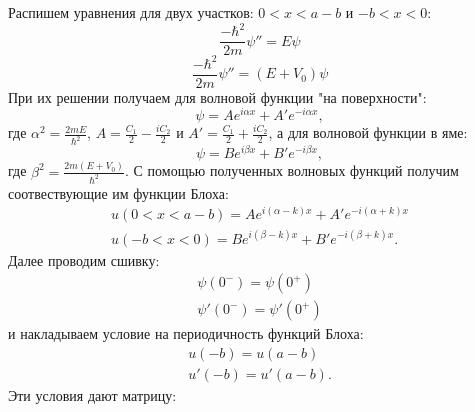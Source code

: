 \documentclass[a4paper, 12pt]{article}
\begin{document}
    Распишем уравнения для двух участков: $0<x<a-b$ и $-b<x<0$:
    \begin{equation}
        \frac{-\hbar^2}{2m}\psi''=E\psi
    \end{equation}
    \begin{equation}
        \frac{-\hbar^2}{2m}\psi''=(E+V_0)\psi
    \end{equation}
    При их решении получаем для волновой функции "на поверхности":
    \begin{equation}
        \psi=Ae^{i\alpha x}+A'e^{-i\alpha x},
    \end{equation}
    где $\alpha^2=\frac{2mE}{\hbar^2}$, $A=\frac{C_1}{2}-\frac{iC_2}{2}$ и $A'=\frac{C_1}{2}+\frac{iC_2}{2}$, а для волновой функции в яме:
    \begin{equation}
        \psi=Be^{i\beta x}+B'e^{-i\beta x},
    \end{equation}
    где $\beta^2=\frac{2m(E+V_0)}{\hbar^2}$. С помощью полученных волновых функций получим соотвествующие им функции Блоха:
    \begin{equation}
        \begin{aligned}
            u(0<x<a-b)=Ae^{i(\alpha-k)x}+A'e^{-i(\alpha+k)x}\\
            u(-b<x<0)=Be^{i(\beta-k)x}+B'e^{-i(\beta+k)x}.
        \end{aligned}
    \end{equation}
    Далее проводим сшивку:
    \begin{equation}
        \begin{aligned}
            \psi(0^-)=\psi(0^+)\\
            \psi'(0^-)=\psi'(0^+)
        \end{aligned}
    \end{equation}
    и накладываем условие на периодичность функций Блоха:
    \begin{equation}
        \begin{aligned}
            u(-b)=u(a-b)\\
            u'(-b)=u'(a-b).
        \end{aligned}
    \end{equation}
    Эти условия дают матрицу:
\end{document}
